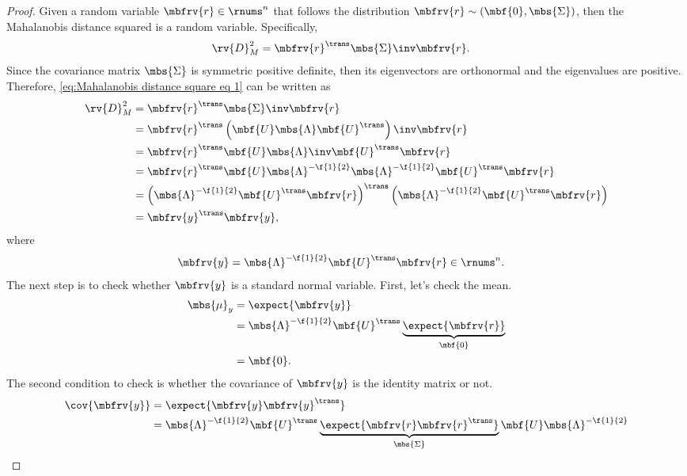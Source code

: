 \begin{proof}
    Given a random variable $\mbfrv{r}\in\rnums^{n}$ that follows the distribution $\mbfrv{r}\sim\left(\mbf{0},\mbs{\Sigma} \right)$, then the Mahalanobis distance squared is a random variable. Specifically,
    \begin{align}
        \label{eq:Mahalanobis distance square eq 1}
        \rv{D}_{M}^{2} &= \mbfrv{r}^{\trans}\mbs{\Sigma}\inv\mbfrv{r}.
    \end{align}
    Since the covariance matrix $\mbs{\Sigma}$ is symmetric positive definite, then its eigenvectors are orthonormal and the eigenvalues are positive. Therefore, \eqref{eq:Mahalanobis distance square eq 1} can be written as
    \begin{align}
        \rv{D}_{M}^{2} 
        &= \mbfrv{r}^{\trans}\mbs{\Sigma}\inv\mbfrv{r}\\
        &= \mbfrv{r}^{\trans}\left(\mbf{U}\mbs{\Lambda}\mbf{U}^{\trans} \right)\inv\mbfrv{r}\\
        &= \mbfrv{r}^{\trans}\mbf{U}\mbs{\Lambda}\inv\mbf{U}^{\trans}\mbfrv{r}\\
        &= \mbfrv{r}^{\trans}\mbf{U}\mbs{\Lambda}^{-\f{1}{2}}\mbs{\Lambda}^{-\f{1}{2}}\mbf{U}^{\trans}\mbfrv{r}\\
        &= \left(\mbs{\Lambda}^{-\f{1}{2}}\mbf{U}^{\trans}\mbfrv{r}\right)^{\trans}\left(\mbs{\Lambda}^{-\f{1}{2}}\mbf{U}^{\trans}\mbfrv{r}\right)\\
        &= \mbfrv{y}^{\trans}\mbfrv{y},
    \end{align}
    where
    \begin{align}
        \mbfrv{y} &= \mbs{\Lambda}^{-\f{1}{2}}\mbf{U}^{\trans}\mbfrv{r}\in\rnums^{n}.
    \end{align}
    The next step is to check whether $\mbfrv{y}$ is a standard normal variable. First, let's check the mean.
    \begin{align}
        \mbs{\mu}_{y} 
        &= \expect{\mbfrv{y}} \\
        &= \mbs{\Lambda}^{-\f{1}{2}}\mbf{U}^{\trans}\underbrace{\expect{\mbfrv{r}}}_{\mbf{0}}\\
        &= \mbf{0}.
    \end{align}
    The second condition to check is whether the covariance of $\mbfrv{y}$ is the identity matrix or not.
    \begin{align}
        \cov{\mbfrv{y}} 
        &= \expect{\mbfrv{y}\mbfrv{y}^{\trans}}\\
        &= \mbs{\Lambda}^{-\f{1}{2}}\mbf{U}^{\trans}\underbrace{\expect{\mbfrv{r}\mbfrv{r}^{\trans}}}_{\mbs{\Sigma}}\mbf{U}\mbs{\Lambda}^{-\f{1}{2}}\\

\end{align}
\end{proof}
